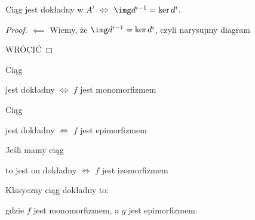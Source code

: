 \begin{lemma}
  Ciąg jest dokładny w $A^i$ $\iff$ $\img d^{i-1}=\ker d^i$.
\end{lemma}

\begin{proof}
  $\impliedby$ 
  Wiemy, że $\img d^{i-1}=\ker d^i$, czyli narysujmy diagram
  \begin{center}\end{center}
  {\large\color{red}WRÓCIĆ}
\end{proof}

\begin{example}
  \item Ciąg  jest dokładny $\iff$ $f$ jest monomorfizmem 
  \item Ciąg  jest dokładny $\iff$ $f$ jest epimorfizmem 
  \item Jeśli mamy ciąg  to jest on dokładny $\iff$ $f$ jest izomorfizmem
  \item Klasyczny ciąg dokładny to:
    \begin{center}\end{center}
    gdzie $f$ jest monomorfizmem, a $g$ jest epimorfizmem.
\end{example}

